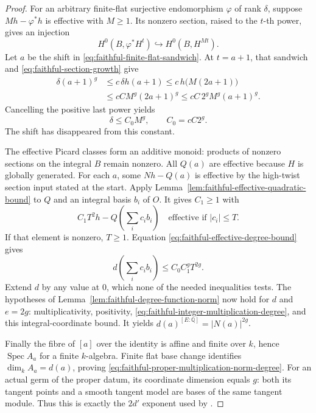 \begin{proof}
For an arbitrary finite-flat surjective endomorphism
\(\varphi\) of rank \(\delta\), suppose
\(M h-\varphi^*h\) is effective with \(M\ge1\).
Its nonzero section, raised to the \(t\)-th power, gives an
injection
\[
       H^0(B,\varphi^*H^t)\hookrightarrow H^0(B,H^{Mt}).
\]
Let \(a\) be the shift in
\eqref{eq:faithful-finite-flat-sandwich}.
At \(t=a+1\), that sandwich and
\eqref{eq:faithful-section-growth} give
\[
 \begin{split}
 \delta(a+1)^g
  &\le c\,\delta h(a+1)
   \le c\,h\bigl(M(2a+1)\bigr)\\
  &\le cC M^g(2a+1)^g
   \le cC\,2^g M^g(a+1)^g .
 \end{split}
\]
Cancelling the positive last power yields
\[
                         \delta\le C_0 M^g,\qquad C_0=cC2^g.
 \tag{DG9}\label{eq:faithful-effective-degree-bound}
\]
The shift has disappeared from this constant.

The effective Picard classes form an additive monoid:
products of nonzero sections on the integral \(B\) remain
nonzero.
All \(Q(a)\) are effective because \(H\) is globally
generated.  For each \(a\), some \(Nh-Q(a)\) is effective
by the high-twist section input stated at the start.
Apply Lemma~\ref{lem:faithful-effective-quadratic-bound}
to \(Q\) and an integral basis \(b_i\) of \(O\).
It gives \(C_1\ge1\) with
\[
 C_1T^2h-Q\!\left(\sum_i c_i b_i\right)
                  \quad\text{effective if }|c_i|\le T.
\]
If that element is nonzero, \(T\ge1\).
Equation \eqref{eq:faithful-effective-degree-bound} gives
\[
        d\!\left(\sum_i c_i b_i\right)
                             \le C_0 C_1^g T^{2g}.
\]
Extend \(d\) by any value at \(0\), which none of the
needed inequalities tests.
The hypotheses of
Lemma~\ref{lem:faithful-degree-function-norm} now hold for
\(d\) and \(e=2g\): multiplicativity, positivity,
\eqref{eq:faithful-integer-multiplication-degree}, and this
integral-coordinate bound.
It yields
\(d(a)^{[E:\mathbb Q]}=|N(a)|^{2g}\).

Finally the fibre of \([a]\) over the identity is affine
and finite over \(k\), hence \(\operatorname{Spec}A_a\)
for a finite \(k\)-algebra.
Finite flat base change identifies \(\dim_kA_a=d(a)\),
proving \eqref{eq:faithful-proper-multiplication-norm-degree}.
For an actual germ of the proper datum, its coordinate
dimension equals \(g\): both its tangent points and a
smooth tangent model are bases of the same tangent module.
Thus this is exactly the \(2d'\) exponent used by
.
\end{proof}

